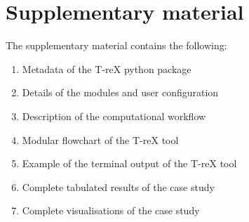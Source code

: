 \documentclass[review,3p,authoryear]{elsarticle}
\begin{document}
\section*{Supplementary material}
    The supplementary material contains the following:
    \begin{enumerate}
        \item Metadata of the T-reX python package
        \item Details of the modules and user configuration
        \item Description of the computational workflow
        \item Modular flowchart of the T-reX tool
        \item Example of the terminal output of the T-reX tool
        \item Complete tabulated results of the case study
        \item Complete visualisations of the case study
    \end{enumerate}



    


\end{document}
